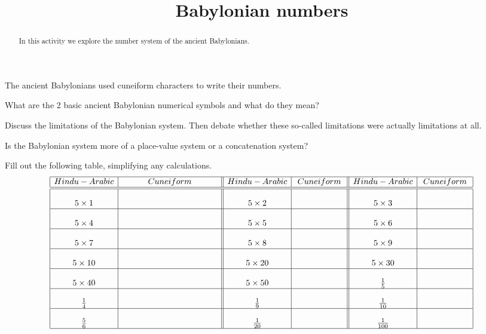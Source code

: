 \documentclass[nooutcomes]{ximera}
\title{Babylonian numbers}
\begin{document}
\begin{abstract}In this activity we explore the number system of the ancient
  Babylonians.
\end{abstract} 
\maketitle


The ancient Babylonians used cuneiform characters to write their
numbers.

\begin{exercise}
What are the 2 basic ancient Babylonian numerical symbols and what do
they mean?
\end{exercise}






\begin{exploration}
Discuss the limitations of the Babylonian system. Then debate whether
these so-called limitations were actually limitations at all.
\end{exploration}

\begin{exploration}
Is the Babylonian system more of a place-value system or a
concatenation system?
\end{exploration}


\begin{problem} 
Fill out the following table, simplifying any calculations.
\[
\begin{array}{| c | c || c | c || c | c |}
\hline %
Hindu-Arabic  & Cuneiform & Hindu-Arabic & Cuneiform & Hindu-Arabic & Cuneiform \\ \hline\hline 
5 \times 1 &\rule[7mm]{20mm}{0mm}\hspace{20mm}  & 5 \times 2  &\hspace{20mm}  & 5 \times 3 & \hspace{20mm}\\ \hline
5 \times 4 &\rule[0mm]{0mm}{7mm}   & 5 \times 5 &  & 5 \times 6 &   \\ \hline
5 \times 7 &\rule[0mm]{0mm}{7mm}   & 5 \times 8 &  & 5 \times 9 &   \\ \hline
5 \times 10 &\rule[0mm]{0mm}{7mm}   & 5 \times 20 &  & 5 \times 30 &   \\ \hline
5 \times 40 &\rule[0mm]{0mm}{7mm}   & 5 \times 50 &  & \frac15 &   \\ \hline
\frac{1}{4} &\rule[0mm]{0mm}{7mm}   & \frac{1}{9} &  & \frac{1}{10}&   \\ \hline
\frac{5}{6} & \rule[0mm]{0mm}{7mm}  & \frac{1}{20} &  & \frac{1}{100} &   \\ \hline
\end{array}
\]
\end{problem}
\end{document}

